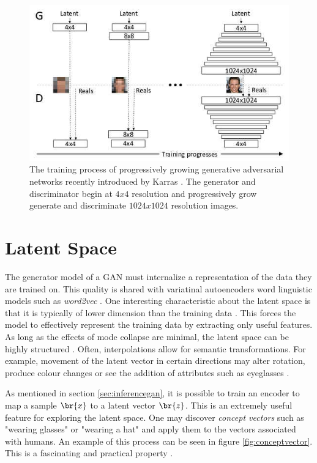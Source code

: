 \documentclass[11pt]{article}
\begin{document}
\begin{figure}
\centering
\includegraphics[scale=0.45]{progressive_growing}
\caption{The training process of progressively growing generative adversarial networks recently introduced by Karras  \citep{2017arXiv171010196K}. The generator and discriminator begin at $4x4$ resolution and progressively grow generate and discriminate $1024x1024$ resolution images.}
\label{fig:ProgressiveGrowingGAN}
\end{figure}



\section{Latent Space} \label{sed:latentspace}
The generator model of a GAN must internalize a representation of the data they are trained on. This quality is shared with variatinal autoencoders word linguistic models such as \textit{word2vec} \citep{2017arXiv171007035C}. One interesting characteristic about the latent space is that it is typically of lower dimension than the training data \citep{2017arXiv171007035C}. This forces the model to effectively represent the training data by extracting only useful features. As long as the effects of mode collapse are minimal, the latent space can be highly structured \citep{2017arXiv171007035C}. Often, interpolations allow for semantic transformations. For example, movement of the latent vector in certain directions may alter rotation, produce colour changes or see the addition of attributes such as eyeglasses \citep{2017arXiv171007035C}.

As mentioned in section \ref{sec:inferencegan}, it is possible to train an encoder to map a sample $\br{x}$ to a latent vector $\br{z}$. This is an extremely useful feature for exploring the latent space. One may discover \textit{concept vectors} such as "wearing glasses" or "wearing a hat" and apply them to the vectors associated with humans. An example of this process can be seen in figure \ref{fig:conceptvector}. This is a fascinating and practical property \citep{2017arXiv171007035C}.
\end{document}
